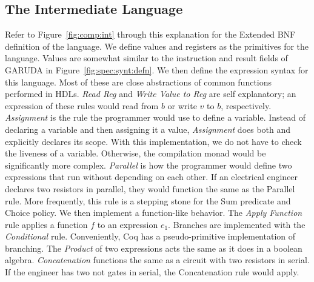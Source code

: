 \documentclass[sigconf,usenames,dvipsnames,svgnames,table]{acmart}
\def \oldname {\textsc{GARUDA}\xspace}
\begin{document}
    \subsection{The Intermediate Language}\label{sec:comp:int}
      Refer to Figure~\ref{fig:comp:int} through this explanation for the Extended BNF~\cite{ISO14977} definition of the language.
      We define values and registers as the primitives for the language.
      Values are somewhat similar to the instruction and result fields of \oldname in Figure~\ref{fig:spec:synt:defn}.
      We then define the expression syntax for this language.
      Most of these are close abstractions of common functions performed in HDLs.
      \textit{Read Reg} and \textit{Write Value to Reg} are self explanatory; an expression of these rules would read from $b$ or write $v$ to $b$, respectively.
      \textit{Assignment} is the rule the programmer would use to define a variable.
      Instead of declaring a variable and then assigning it a value, \textit{Assignment} does both and explicitly declares its scope.
      With this implementation, we do not have to check the liveness of a variable.
      Otherwise, the compilation monad would be significantly more complex.
      \textit{Parallel} is how the programmer would define two expressions that run without depending on each other.
      If an electrical engineer declares two resistors in parallel, they would function the same as the Parallel rule.
      More frequently, this rule is a stepping stone for the Sum predicate and Choice policy.
      We then implement a function-like behavior.
      The \textit{Apply Function} rule applies a function $f$ to an expression $e_1$.
      Branches are implemented with the \textit{Conditional} rule.
      Conveniently, Coq has a pseudo-primitive implementation of branching.
      The \textit{Product} of two expressions acts the same as it does in a boolean algebra.
      \textit{Concatenation} functions the same as a circuit with two resistors in serial.
      If the engineer has two not gates in serial, the Concatenation rule would apply.
      \par
\end{document}
